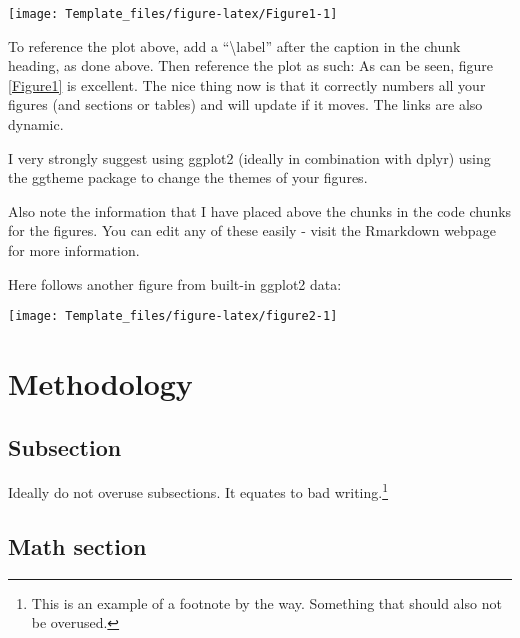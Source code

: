 \documentclass[11pt,preprint, authoryear]{elsarticle}
\let\origfigure\figure
\let\endorigfigure\endfigure
\renewenvironment{figure}[1][2] {
    \expandafter\origfigure\expandafter[H]
} {
    \endorigfigure
}
\numberwithin{equation}{section}
\numberwithin{figure}{section}
\numberwithin{table}{section}
\let\rmarkdownfootnote\footnote%
\def\footnote{\protect\rmarkdownfootnote}
\begin{document}
\begin{figure}[H]

{\centering \texttt{[image: Template\_files/figure-latex/Figure1-1]} 

}

\caption{Caption Here \label{Figure1}}\label{fig:Figure1}
\end{figure}

To reference the plot above, add a ``\textbackslash{}label'' after the
caption in the chunk heading, as done above. Then reference the plot as
such: As can be seen, figure \ref{Figure1} is excellent. The nice thing
now is that it correctly numbers all your figures (and sections or
tables) and will update if it moves. The links are also dynamic.

I very strongly suggest using ggplot2 (ideally in combination with
dplyr) using the ggtheme package to change the themes of your figures.

Also note the information that I have placed above the chunks in the
code chunks for the figures. You can edit any of these easily - visit
the Rmarkdown webpage for more information.

Here follows another figure from built-in ggplot2 data:

\begin{figure}[H]

{\centering \texttt{[image: Template\_files/figure-latex/figure2-1]} 

}

\caption{Diamond Cut Plot \label{lit}}\label{fig:figure2}
\end{figure}

\section{Methodology}\label{methodology}

\subsection{Subsection}\label{subsection}

Ideally do not overuse subsections. It equates to bad writing.\footnote{This
  is an example of a footnote by the way. Something that should also not
  be overused.}

\subsection{Math section}\label{math-section}
\end{document}
